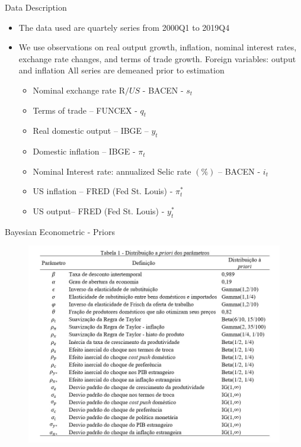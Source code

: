 \documentclass[9pt]{beamer}
\begin{document}
\begin{frame}{Data Description}
\begin{itemize}
    \item The data used are quartely series from 2000Q1 to 2019Q4
    
    \item We use observations on real output growth, inflation, nominal interest rates, exchange rate changes, and terms of trade growth. Foreign variables: output and inflation All series are demeaned prior to estimation
    
    \begin{itemize}
        \item 	Nominal exchange rate R$/US$ - BACEN - $s_t$
        
        \item 	Terms of trade – FUNCEX - $q_t$
        
        \item 	Real domestic output – IBGE – $y_t$
        
        \item 	Domestic inflation – IBGE - $\pi_t$
        
        \item 	Nominal Interest rate: annualized Selic rate $(\%)$ – BACEN - $i_t$
        
        \item 	US inflation – FRED (Fed St. Louis) -  $\pi_t^{*}$
        
        \item US output– FRED (Fed St. Louis) -  $y_t^{*}$
    \end{itemize}
    
    
\end{itemize}
\end{frame}
\begin{frame}{Bayesian Econometric - Priors}
\begin{figure}[H]
\centering
\includegraphics[scale=0.55]{Figuras/Tabelaprioris.jpg}
\end{figure}


\end{frame}
\end{document}
